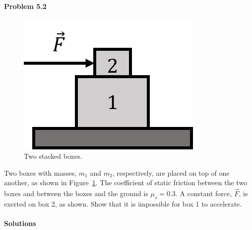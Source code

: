 \begin{framed}
\textbf{Problem 5.2}\\
\begin{figure}[!htbp]
\centering
\includegraphics[width=0.2\linewidth]{files/twoboxes-82f598e4aff4cedbd966b3a0553e7309.png}
\caption[]{Two stacked boxes.}
\label{fig:newtonslaws:twoboxes}
\end{figure}

Two boxes with masses, $m_1$ and $m_2$, respectively, are placed on top of one another, as shown in Figure~\ref{fig:newtonslaws:twoboxes}. The coefficient of static friction between the two boxes and between the boxes and the ground is $\mu_s=0.3$. A constant force, $\vec F$, is exerted on box 2, as shown. Show that it is impossible for box 1 to accelerate.
\end{framed}

\paragraph{Solutions}

